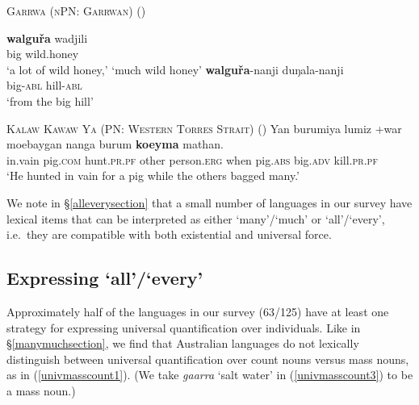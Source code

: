 \documentclass[12pt,egregdoesnotlikesansseriftitles]{scrartcl}
\makeatletter
\newcommand{\ofy}{/125} %
\makeatother
\begin{document}
\begin{exe}
  \ex \textsc{Garrwa (nPN: Garrwan)} (\citealt{furby77}) \label{bigquant1}
  \begin{xlist}
    \ex \gll \textbf{walgu\v{r}a} wadjili \\
    big wild.honey\\
    \glt `a lot of wild honey,' `much wild honey' %
    \ex \gll \textbf{walgu\v{r}a}-nanji duŋala-nanji\\
    big-\textsc{abl} hill-\textsc{abl}\\
    \glt `from the big hill' %
\end{xlist}    
  \ex \textsc{Kalaw Kawaw Ya (PN: Western Torres Strait)} (\citealt[141]{fo91}) \label{bigquant2}
  \gll Yan burumiya lumiz +war moebaygan nanga burum        \textbf{koeyma}    mathan.\\
  in.vain pig.\textsc{com} hunt.\textsc{pr.pf} other person.\textsc{erg} when   pig.\textsc{abs}    big.\textsc{adv}    kill.\textsc{pr.pf}\\
  \glt `He hunted in vain for a pig while the others bagged many.'
  
\end{exe}

We note in \S\ref{alleverysection} that a small number of languages in our survey have lexical items that can be interpreted as either `many'/`much' or `all'/`every', i.e.\ they are compatible with both existential and universal force.

\subsection{Expressing `all'/`every' \label{alleverysection}}

Approximately half of the languages in our survey (63\ofy) have at least one strategy for expressing universal quantification over individuals. Like in \S\ref{manymuchsection}, we find that Australian languages do not lexically distinguish between universal quantification over count nouns versus mass nouns, as in (\ref{univmasscount1}). (We take \textit{gaarra} `salt water' in (\ref{univmasscount3}) to be a mass noun.)
\end{document}
